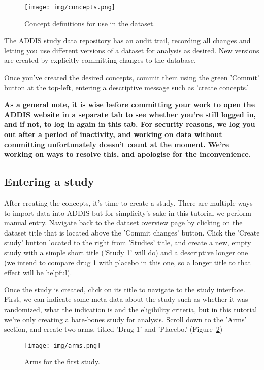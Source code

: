 \documentclass[12pt]{article}
\begin{document}
\begin{figure}[!htbp]
  \centering
  \texttt{[image: img/concepts.png]}
  \caption{Concept definitions for use in the dataset.}
\label{fig:concepts}
\end{figure}

The ADDIS study data repository has an audit trail, recording all changes and letting you use different versions of a dataset for analysis as desired. New versions are created by explicitly committing changes to the database.

Once you've created the desired concepts, commit them using the green 'Commit' button at the top-left, entering a descriptive message such as 'create concepts.'

\textbf{As a general note, it is wise before committing your work to open the ADDIS website in a separate tab to see whether you're still logged in, and if not, to log in again in this tab. For security reasons, we log you out after a period of inactivity, and working on data without committing unfortunately doesn't count at the moment. We're working on ways to resolve this, and apologise for the inconvenience.}

\subsection{Entering a study}

After creating the concepts, it's time to create a study. There are multiple ways to import data into ADDIS but for simplicity's sake in this tutorial we perform manual entry. Navigate back to the dataset overview page by clicking on the dataset title that is located above the 'Commit changes' button. Click the 'Create study' button located to the right from 'Studies' title, and create a new, empty study with a simple short title ('Study 1' will do) and a descriptive longer one (we intend to compare drug 1 with placebo in this one, so a longer title to that effect will be helpful).

Once the study is created, click on its title to navigate to the study interface. First, we can indicate some meta-data about the study such as whether it was randomized, what the indication is and the eligibility criteria, but in this tutorial we're only creating a bare-bones study for analysis. Scroll down to the 'Arms' section, and create two arms, titled 'Drug 1' and 'Placebo.' (Figure~\ref{fig:arms})

\begin{figure}[!htbp]
  \centering
  \texttt{[image: img/arms.png]}
  \caption{Arms for the first study.}
\label{fig:arms}
\end{figure}
\end{document}
